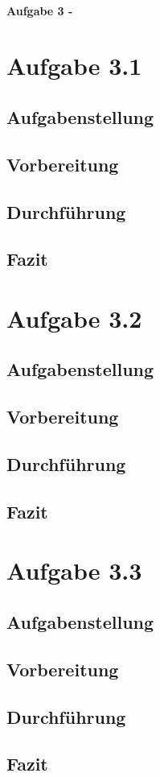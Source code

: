 \newpage

\paragraph{\LARGE Aufgabe 3 - }

\section{Aufgabe 3.1}
	\subsection{Aufgabenstellung}
	\subsection{Vorbereitung}
	
	\subsection{Durchführung}
	\subsection{Fazit}

\section{Aufgabe 3.2}
	\subsection{Aufgabenstellung}
	\subsection{Vorbereitung}
	\subsection{Durchführung}
	\subsection{Fazit}

\section{Aufgabe 3.3}
	\subsection{Aufgabenstellung}
	\subsection{Vorbereitung}
	\subsection{Durchführung}
	\subsection{Fazit}
	

